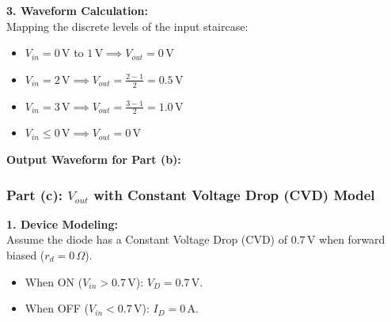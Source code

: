 \documentclass[12pt,a3paper]{article}
\begin{document}
\begin{enumerate}
\begin{tcolorbox}[enhanced,breakable,ansbox,colback=cA!4,colframe=cA,boxrule=0.8pt,arc=5pt,title={\textbf{Answer}},fonttitle=\bfseries\color{white},colbacktitle=cA]
\textbf{3. Waveform Calculation:}\\
Mapping the discrete levels of the input staircase:
\begin{itemize}
    \item $V_{in} = 0\,\text{V}$ to $1\,\text{V} \implies V_{out} = 0\,\text{V}$
    \item $V_{in} = 2\,\text{V} \implies V_{out} = \frac{2 - 1}{2} = 0.5\,\text{V}$
    \item $V_{in} = 3\,\text{V} \implies V_{out} = \frac{3 - 1}{2} = 1.0\,\text{V}$
    \item $V_{in} \le 0\,\text{V} \implies V_{out} = 0\,\text{V}$
\end{itemize}

\textbf{Output Waveform for Part (b):}
\begin{center}
\end{center}

\vspace{0.5em}
\hrulefill
\vspace{0.5em}

\subsubsection*{Part (c): $V_{out}$ with Constant Voltage Drop (CVD) Model}

\textbf{1. Device Modeling:}\\
Assume the diode has a Constant Voltage Drop (CVD) of $0.7\,\text{V}$ when forward biased ($r_d = 0\,\Omega$). 
\begin{itemize}
    \item When ON ($V_{in} > 0.7\,\text{V}$): $V_D = 0.7\,\text{V}$.
    \item When OFF ($V_{in} < 0.7\,\text{V}$): $I_D = 0\,\text{A}$.
\end{itemize}


\end{tcolorbox}
\end{enumerate}
\end{document}
